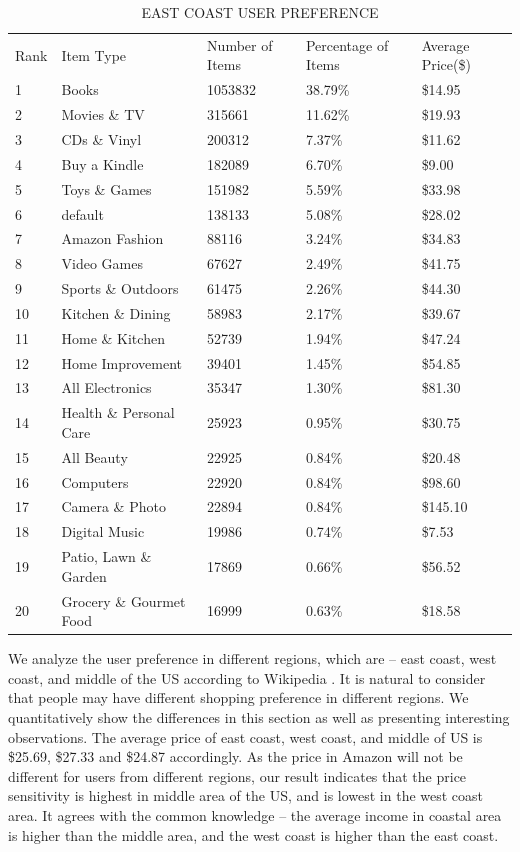 \begin{table}[!htbp]
\centering
\caption{EAST COAST USER PREFERENCE}
\label{tb:east}
\begin{adjustbox}{max width=.5\textwidth}
\begin{tabular}{lllll}
Rank & Item Type          & Number of Items & Percentage of Items & Average Price(\$) \\
1 & Books & 1053832 & 38.79\% & \$14.95 \\
2 & Movies \& TV & 315661 & 11.62\% & \$19.93 \\
3 & CDs \& Vinyl & 200312 & 7.37\% & \$11.62 \\
4 & Buy a Kindle & 182089 & 6.70\% & \$9.00 \\
5 & Toys \& Games & 151982 & 5.59\% & \$33.98 \\
6 & default & 138133 & 5.08\% & \$28.02 \\
7 & Amazon Fashion & 88116 & 3.24\% & \$34.83 \\
8 & Video Games & 67627 & 2.49\% & \$41.75 \\
9 & Sports \& Outdoors & 61475 & 2.26\% & \$44.30 \\
10 & Kitchen \& Dining & 58983 & 2.17\% & \$39.67 \\
11 & Home \& Kitchen & 52739 & 1.94\% & \$47.24 \\
12 & Home Improvement & 39401 & 1.45\% & \$54.85 \\
13 & All Electronics & 35347 & 1.30\% & \$81.30 \\
14 & Health \& Personal Care & 25923 & 0.95\% & \$30.75 \\
15 & All Beauty & 22925 & 0.84\% & \$20.48 \\
16 & Computers & 22920 & 0.84\% & \$98.60 \\
17 & Camera \& Photo & 22894 & 0.84\% & \$145.10 \\
18 & Digital Music & 19986 & 0.74\% & \$7.53 \\
19 & Patio, Lawn \& Garden & 17869 & 0.66\% & \$56.52 \\
20 & Grocery \& Gourmet Food & 16999 & 0.63\% & \$18.58 \\
\end{tabular}
\end{adjustbox}
\end{table}

We analyze the user preference in different regions, which are -- east coast, west coast, and middle of the US according to Wikipedia \cite{east}\cite{west}. It is natural to consider that people may have different shopping preference in different regions. We quantitatively show the differences in this section as well as presenting interesting observations. The average price of east coast, west coast, and middle of US is \$25.69, \$27.33 and \$24.87 accordingly. As the price in Amazon will not be different for users from different regions, our result indicates that the price sensitivity is highest in middle area of the US, and is lowest in the west coast area. It agrees with the common knowledge -- the average income in coastal area is higher than the middle area, and the west coast is higher than the east coast. 

